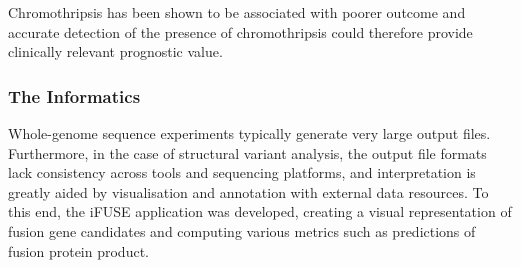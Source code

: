 Chromothripsis has been shown to be associated with poorer outcome \cite{fontana2018chromothripsis,Hirsch2012,magrangeas2011chromothripsis,molenaar} and accurate detection of the presence of chromothripsis could therefore provide clinically relevant prognostic value.









\subsubsection{The Informatics}
Whole-genome sequence experiments typically generate very large output files. Furthermore, in the case of structural variant analysis, the output file formats lack consistency across tools and sequencing platforms, and interpretation is greatly aided by visualisation and annotation with external data resources. To this end, the iFUSE application was developed, creating a visual representation of fusion gene candidates and computing various metrics such as predictions of fusion protein product.

